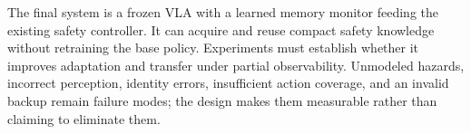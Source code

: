 \documentclass[10pt]{article}
\begin{document}
The final system is a frozen VLA with a learned memory monitor feeding the existing safety controller. It can acquire and reuse compact safety knowledge without retraining the base policy. Experiments must establish whether it improves adaptation and transfer under partial observability. Unmodeled hazards, incorrect perception, identity errors, insufficient action coverage, and an invalid backup remain failure modes; the design makes them measurable rather than claiming to eliminate them.

\clearpage

\end{document}

